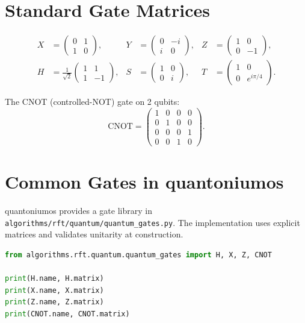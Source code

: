 \documentclass[11pt, a4paper, openany]{book}
\theoremstyle{definition}
\begin{document}
\section{Standard Gate Matrices}
\begin{align}
X &= \begin{pmatrix} 0 & 1 \\ 1 & 0 \end{pmatrix}, &
Y &= \begin{pmatrix} 0 & -i \\ i & 0 \end{pmatrix}, &
Z &= \begin{pmatrix} 1 & 0 \\ 0 & -1 \end{pmatrix}, \\
H &= \frac{1}{\sqrt{2}}\begin{pmatrix} 1 & 1 \\ 1 & -1 \end{pmatrix}, &
S &= \begin{pmatrix} 1 & 0 \\ 0 & i \end{pmatrix}, &
T &= \begin{pmatrix} 1 & 0 \\ 0 & e^{i\pi/4} \end{pmatrix}.
\end{align}

The CNOT (controlled-NOT) gate on 2 qubits:
\begin{equation}
\text{CNOT} = \begin{pmatrix} 1 & 0 & 0 & 0 \\ 0 & 1 & 0 & 0 \\ 0 & 0 & 0 & 1 \\ 0 & 0 & 1 & 0 \end{pmatrix}.
\end{equation}

\section{Common Gates in quantoniumos}
quantoniumos provides a gate library in \texttt{algorithms/rft/quantum/quantum\_gates.py}. The implementation uses explicit matrices and validates unitarity at construction.
\begin{lstlisting}[language=Python, caption={Inspecting Gate Matrices}]
from algorithms.rft.quantum.quantum_gates import H, X, Z, CNOT

print(H.name, H.matrix)
print(X.name, X.matrix)
print(Z.name, Z.matrix)
print(CNOT.name, CNOT.matrix)
\end{lstlisting}
\end{document}
